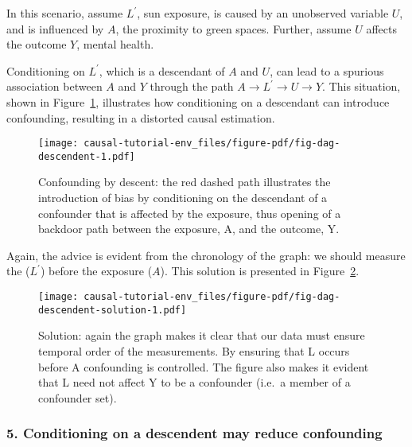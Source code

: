\documentclass[
  singlecolumn]{article}
\begin{document}
In this scenario, assume \(L^\prime\), sun exposure, is caused by an
unobserved variable \(U\), and is influenced by \(A\), the proximity to
green spaces. Further, assume \(U\) affects the outcome \(Y\), mental
health.

Conditioning on \(L^\prime\), which is a descendant of \(A\) and \(U\),
can lead to a spurious association between \(A\) and \(Y\) through the
path \(A \to L^\prime \to U \to Y\). This situation, shown in
Figure~\ref{fig-dag-descendent}, illustrates how conditioning on a
descendant can introduce confounding, resulting in a distorted causal
estimation.

\begin{figure}

{\centering \texttt{[image: causal-tutorial-env\_files/figure-pdf/fig-dag-descendent-1.pdf]}

}

\caption{\label{fig-dag-descendent}Confounding by descent: the red
dashed path illustrates the introduction of bias by conditioning on the
descendant of a confounder that is affected by the exposure, thus
opening of a backdoor path between the exposure, A, and the outcome, Y.}

\end{figure}

Again, the advice is evident from the chronology of the graph: we should
measure the (\(L^\prime\)) before the exposure (\(A\)). This solution is
presented in Figure~\ref{fig-dag-descendent-solution}.

\begin{figure}

{\centering \texttt{[image: causal-tutorial-env\_files/figure-pdf/fig-dag-descendent-solution-1.pdf]}

}

\caption{\label{fig-dag-descendent-solution}Solution: again the graph
makes it clear that our data must ensure temporal order of the
measurements. By ensuring that L occurs before A confounding is
controlled. The figure also makes it evident that L need not affect Y to
be a confounder (i.e.~a member of a confounder set).}

\end{figure}

\hypertarget{conditioning-on-a-descendent-may-reduce-confounding}{%
\subsubsection{5. Conditioning on a descendent may reduce
confounding}\label{conditioning-on-a-descendent-may-reduce-confounding}}
\end{document}
